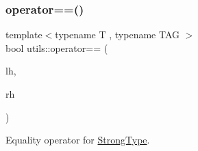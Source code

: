 \subsubsection{\texorpdfstring{operator==()}{operator==()}}
{\footnotesize\ttfamily template$<$typename T , typename T\+AG $>$ \\
bool utils\+::operator== (\begin{DoxyParamCaption}\item[{\mbox{\hyperlink{classutils_1_1_strong_type}{Strong\+Type}}$<$ T, T\+AG $>$}]{lh,  }\item[{\mbox{\hyperlink{classutils_1_1_strong_type}{Strong\+Type}}$<$ T, T\+AG $>$}]{rh }\end{DoxyParamCaption})\hspace{0.3cm}{\ttfamily [inline]}}



Equality operator for \mbox{\hyperlink{classutils_1_1_strong_type}{Strong\+Type}}. 

